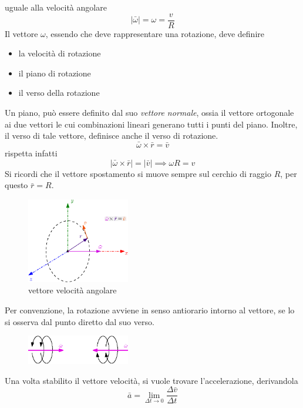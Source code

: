 \documentclass[10pt, letterpaper]{report}
\begin{document}
uguale alla velocità angolare 
$$ |\bar \omega|=\omega = \frac{v}{R}$$
Il vettore $\omega$, essendo che deve rappresentare una rotazione, deve definire \begin{itemize}
    \item la velocità di rotazione 
    \item il piano di rotazione 
    \item il verso della rotazione 
\end{itemize}
Un piano, può essere definito dal suo \textit{vettore normale}, ossia il vettore ortogonale ai due 
vettori le cui combinazioni lineari generano tutti i punti del piano. Inoltre, il verso di tale vettore, 
definisce anche il verso di rotazione. 
$$\bar \omega \times \bar r = \bar v$$
rispetta infatti 
$$|\bar \omega \times \bar r| = |\bar v|\implies \omega R = v$$
Si ricordi che il vettore spostamento si muove sempre sul cerchio di raggio $R$, per questo 
$\bar r = R$.
\begin{center}
    \begin{figure}[h!]
        \centering
        \includegraphics[width=0.4\textwidth]{images/vetVelocitaAngolare.eps}
        \caption{vettore velocità angolare}
    \end{figure} 
\end{center}
Per convenzione, la rotazione avviene in senso antiorario intorno al vettore, se lo si osserva dal punto 
diretto dal suo verso.\begin{center}
    \begin{figure}[h!]
        \centering
        \includegraphics[width=0.4\textwidth]{images/dirVetAng.eps}
    \end{figure} 
\end{center}
Una volta stabilito il vettore velocità, si vuole trovare l'accelerazione, derivandola 
$$ \bar a = \lim_{\Delta t\rightarrow 0}\dfrac{\Delta \bar v}{\Delta t}$$
\end{document}
